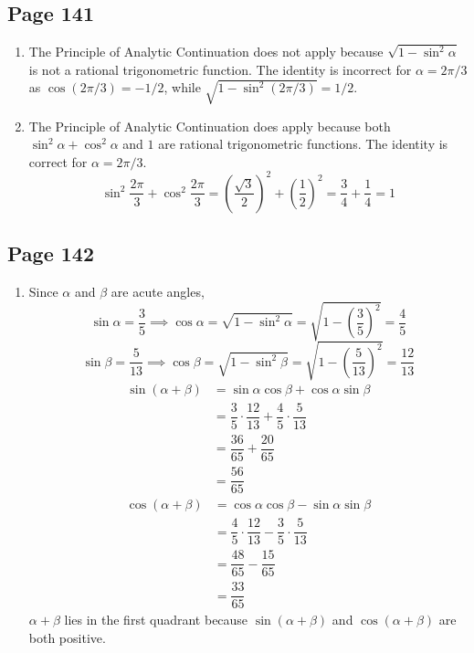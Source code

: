 \documentclass{article}
\newenvironment{solutions}[1]
{\subsection*{#1}
 \begin{enumerate}[leftmargin=1.5em]}
{\end{enumerate}}
\newcommand{\solution}{\item}
\newenvironment{subsolutions}
{\begin{enumerate}}
{\end{enumerate}}
\begin{document}
\begin{solutions}{Page 141}
\begin{subsolutions}
\end{subsolutions}
\solution %
The Principle of Analytic Continuation does not apply because $\sqrt{1-\sin^{2}{\alpha}}$ is not a rational trigonometric function. The identity is incorrect for $\alpha=2\pi / 3$ as $\cos\left(2\pi / 3\right) = -1/2$, while $\sqrt{1-\sin^{2}\left(2\pi / 3\right)} = 1/2$.
\solution %
The Principle of Analytic Continuation does apply because both $\sin^{2}{\alpha}+\cos^{2}{\alpha}$ and $1$ are rational trigonometric functions. The identity is correct for $\alpha=2\pi / 3$.
\[
\sin^{2}{\dfrac{2\pi}{3}}+\cos^{2}{\dfrac{2\pi}{3}} = \left(\dfrac{\sqrt{3}}{2}\right)^2 + \left(\dfrac{1}{2}\right)^2 = \dfrac{3}{4} + \dfrac{1}{4} = 1
\]
\end{solutions}

\begin{solutions}{Page 142}
\solution %
Since $\alpha$ and $\beta$ are acute angles,
\[
\sin{\alpha} = \dfrac{3}{5} \implies \cos{\alpha} = \sqrt{1-\sin^{2}{\alpha}} = \sqrt{1-\left(\dfrac{3}{5}\right)^2} = \dfrac{4}{5}
\]
\[
\sin{\beta} = \dfrac{5}{13} \implies \cos{\beta} = \sqrt{1-\sin^{2}{\beta}} = \sqrt{1-\left(\dfrac{5}{13}\right)^2} = \dfrac{12}{13}
\]
\begin{align*}
\sin\left(\alpha+\beta\right) &= \sin{\alpha}\cos{\beta} + \cos{\alpha}\sin{\beta} \\
&= \dfrac{3}{5} \cdot \dfrac{12}{13} + \dfrac{4}{5} \cdot \dfrac{5}{13} \\
&= \dfrac{36}{65} + \dfrac{20}{65} \\
&= \dfrac{56}{65}
\end{align*}
\begin{align*}
\cos\left(\alpha+\beta\right) &= \cos{\alpha}\cos{\beta} - \sin{\alpha}\sin{\beta} \\
&= \dfrac{4}{5} \cdot \dfrac{12}{13} - \dfrac{3}{5} \cdot \dfrac{5}{13} \\
&= \dfrac{48}{65} - \dfrac{15}{65} \\
&= \dfrac{33}{65}
\end{align*}
$\alpha+\beta$ lies in the first quadrant because $\sin\left(\alpha+\beta\right)$ and $\cos\left(\alpha+\beta\right)$ are both positive.


\end{solutions}
\end{document}
